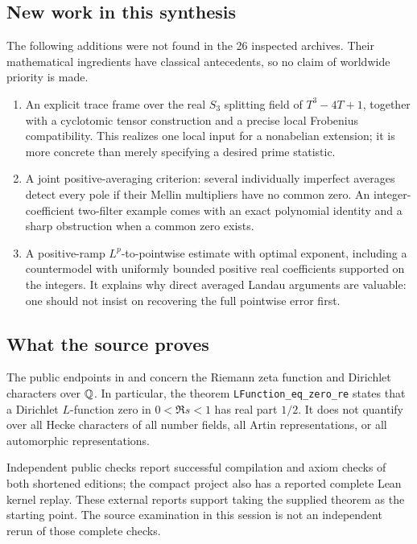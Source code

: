 \subsection{New work in this synthesis}

The following additions were not found in the 26 inspected archives. Their mathematical ingredients have classical antecedents, so no claim of worldwide priority is made.
\begin{enumerate}
\item An explicit trace frame over the real $S_3$ splitting field of $T^3-4T+1$, together with a cyclotomic tensor construction and a precise local Frobenius compatibility. This realizes one local input for a nonabelian extension; it is more concrete than merely specifying a desired prime statistic.
\item A joint positive-averaging criterion: several individually imperfect averages detect every pole if their Mellin multipliers have no common zero. An integer-coefficient two-filter example comes with an exact polynomial identity and a sharp obstruction when a common zero exists.
\item A positive-ramp $L^p$-to-pointwise estimate with optimal exponent, including a countermodel with uniformly bounded positive real coefficients supported on the integers. It explains why direct averaged Landau arguments are valuable: one should not insist on recovering the full pointwise error first.
\end{enumerate}

\subsection{What the source proves}

The public endpoints in  and  concern the Riemann zeta function and Dirichlet characters over $\mathbb Q$. In particular, the theorem \texttt{LFunction\_eq\_zero\_re} states that a Dirichlet $L$-function zero in $0<\Re s<1$ has real part $1/2$. It does not quantify over all Hecke characters of all number fields, all Artin representations, or all automorphic representations.\cite{source}

Independent public checks report successful compilation and axiom checks of both shortened editions; the compact project also has a reported complete Lean kernel replay. These external reports support taking the supplied theorem as the starting point. The source examination in this session is not an independent rerun of those complete checks.\cite{Sutherland,Rubinstein}

